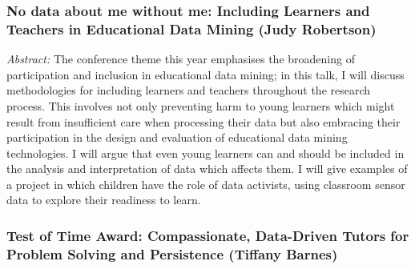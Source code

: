 \documentclass[letterpaper,11pt,oneside]{book} %
\begin{document}
\hypertarget{no-data-about-me-without-me-including-learners-and-teachers-in-educational-data-mining-judy-robertson}{%
\subsubsection{No data about me without me: Including Learners and
Teachers in Educational Data Mining (Judy
Robertson)}\label{no-data-about-me-without-me-including-learners-and-teachers-in-educational-data-mining-judy-robertson}}

\emph{Abstract:} The conference theme this year emphasises the
broadening of participation and inclusion in educational data mining; in
this talk, I will discuss methodologies for including learners and
teachers throughout the research process. This involves not only
preventing harm to young learners which might result from insufficient
care when processing their data but also embracing their participation
in the design and evaluation of educational data mining technologies. I
will argue that even young learners can and should be included in the
analysis and interpretation of data which affects them. I will give
examples of a project in which children have the role of data activists,
using classroom sensor data to explore their readiness to learn.

\hypertarget{test-of-time-award-compassionate-data-driven-tutors-for-problem-solving-and-persistence-tiffany-barnes}{%
\subsubsection{Test of Time Award: Compassionate, Data-Driven Tutors for
Problem Solving and Persistence (Tiffany
Barnes)}\label{test-of-time-award-compassionate-data-driven-tutors-for-problem-solving-and-persistence-tiffany-barnes}}
\end{document}
